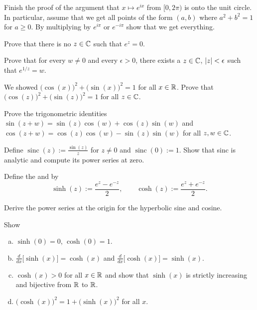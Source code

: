 \begin{exercise}
Finish the proof of the argument that $x \mapsto e^{ix}$ from
$[0,2\pi)$ is onto the unit circle.  In particular, assume that
we get all points of the form $(a,b)$ where $a^2+b^2=1$ for $a \geq 0$.
By multiplying by $e^{i\pi}$ or $e^{-i\pi}$ show that we get everything.
\end{exercise}

\begin{exercise}
Prove that there is no $z \in {\mathbb{C}}$ such that $e^z = 0$.
\end{exercise}

\begin{exercise}
Prove that for every $w \not= 0$ and every $\epsilon > 0$,
there exists a $z \in {\mathbb{C}}$, $\lvert {z} \rvert < \epsilon$ such that $e^{1/z} = w$.
\end{exercise}

\begin{exercise}
We showed
${\bigl( \cos(x) \bigr)}^2 + {\bigl( \sin(x) \bigr)}^2 = 1$
for all $x \in {\mathbb{R}}$.
Prove that
${\bigl( \cos(z) \bigr)}^2 + {\bigl( \sin(z) \bigr)}^2 = 1$
for all $z \in {\mathbb{C}}$.
\end{exercise}

\begin{exercise}
Prove the trigonometric identities
$\sin(z + w) = \sin(z) \cos(w) + \cos(z) \sin(w)$ and
$\cos(z + w) = \cos(z) \cos(w) - \sin(z) \sin(w)$ for all $z,w \in {\mathbb{C}}$.
\end{exercise}

\begin{exercise}
Define $\operatorname{sinc}(z) := \frac{\sin(z)}{z}$ for $z \not=0$ and
$\operatorname{sinc}(0) := 1$.
Show that sinc is analytic and compute its power series at zero.
\end{exercise}

\pagebreak[2]
\begin{exnote}
Define the \emph{} and
\emph{} by
\begin{equation*}
\sinh(z) := \frac{e^z-e^{-z}}{2}, \qquad
\cosh(z) := \frac{e^z+e^{-z}}{2}.
\end{equation*}
\end{exnote}

\begin{exercise}
Derive the power series at the origin for the hyperbolic sine and cosine.
\end{exercise}

\begin{exercise}
Show
\begin{enumerate}[a)]
\item
$\sinh(0) = 0$, $\cosh(0) = 1$.
\item
$\frac{d}{dx} \bigl[ \sinh(x) \bigr] = \cosh(x)$ and
$\frac{d}{dx} \bigl[ \cosh(x) \bigr] = \sinh(x)$.
\item
$\cosh(x) > 0$ for all $x \in {\mathbb{R}}$ and show that
$\sinh(x)$ is strictly increasing and bijective
from ${\mathbb{R}}$ to ${\mathbb{R}}$.
\item
${\bigl(\cosh(x)\bigr)}^2 = 1 + {\bigl(\sinh(x)\bigr)}^2$ for all
$x$.
\end{enumerate}
\end{exercise}

